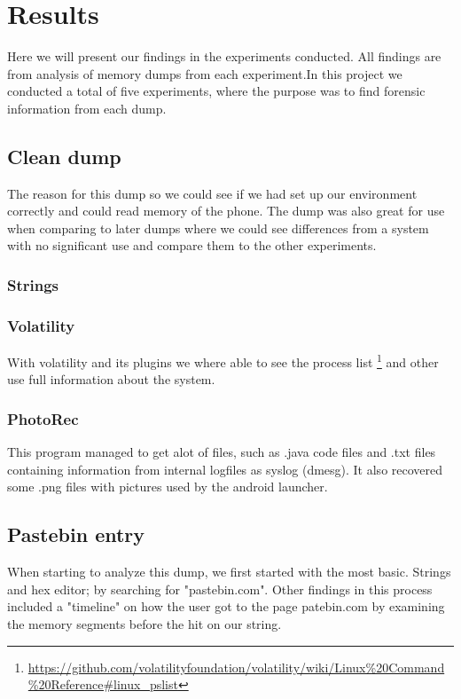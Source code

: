\section{Results}
Here we will present our findings in the experiments conducted. All findings are
from analysis of memory dumps from each experiment.In this project we conducted 
a total of five experiments, where the purpose was to find forensic information 
from each dump.

\subsection{Clean dump}
The reason for this dump so we could see if we had set up our environment 
correctly and could read memory of the phone. The dump was also great for use 
when comparing to later dumps where we could see differences from a system with 
no significant use and compare them to the other experiments.

\subsubsection{Strings}

\subsubsection{Volatility}
With volatility and its plugins we where able to see the process list
\footnote{\url{https://github.com/volatilityfoundation/volatility/wiki/Linux\%20Command\%20Reference\#linux\_pslist}} 
and other use full information about the system.

\subsubsection{PhotoRec}
This program managed to get alot of files, such as .java code files and .txt 
files containing information from internal logfiles as syslog (dmesg). It also 
recovered some .png files with pictures used by the android launcher.

\subsection{Pastebin entry}
When starting to analyze this dump, we first started with the most basic. 
Strings and hex editor; by searching for "pastebin.com". Other findings in this 
process included a "timeline" on how the user got to the page patebin.com by 
examining the memory segments before the hit on our string.

